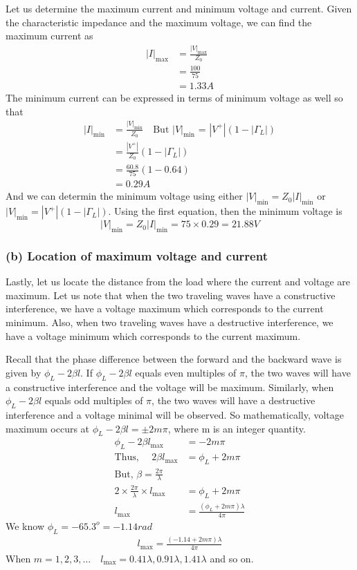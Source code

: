 \begin{exmp}
Let us determine the maximum current and minimum voltage and current. Given the characteristic impedance and the maximum voltage, we can find the maximum current as 
\begin{align*}
|I|_\max&=\frac{|V|_\max}{Z_0}\\
&=\frac{100}{75}\\
&=1.33A
\end{align*}
The minimum current can be expressed in terms of minimum voltage as well so that
\begin{align*}
|I|_\min&=\frac{|V|_\min}{Z_0}\quad\text{But }|V|_\min\text{ = }|V^+|(1 - |\Gamma_L|)\\
&=\frac{|V^{+}|}{Z_0}(1-|\Gamma_{L}|)\\
&=\frac{60.8}{75}(1-0.64)\\
&=0.29A
\end{align*}
And we can determin the minimum voltage using either $|V|_\min=Z_0|I|_\min$ or $|V|_\min=|V^{+}|(1-|\Gamma_{L}|)$. Using the first equation, then the minimum voltage is	
\begin{dmath*}
|V|_\min=Z_0|I|_\min
=75\times0.29=21.88V
\end{dmath*}

\subsubsection*{(b) Location of maximum voltage and current}
Lastly, let us locate the distance from the load where the current and voltage are maximum. Let us note that when the two traveling waves have a constructive interference, we have a voltage maximum which corresponds to the current minimum. Also, when two traveling waves have a destructive interference, we have a voltage minimum which corresponds to the current maximum.

Recall that the phase difference between the forward and the backward wave is given by $\phi_{L}-2\beta l$. If $\phi_{L}-2\beta l$ equals even multiples of $\pi$, the two waves will  have a constructive interference and the voltage will be maximum. Similarly, when $\phi_{L}-2\beta l$ equals odd multiples of $\pi$, the two waves will have a destructive interference and a voltage minimal will be observed. So mathematically, voltage maximum occurs at $\phi_{L}-2\beta l= \pm2m\pi$, where m is an integer quantity.
\begin{align*}
\phi_{L}-2\beta l_\max&=-2m\pi\\
\text{Thus, }\quad2\beta l_\max&= \phi_{L}+2m\pi\\
\text{But, }\beta = \frac{2\pi}{\lambda}\\
2 \times \frac{2\pi}{\lambda}\times l_\max&= \phi_{L}+2m\pi\\
l_\max&=\frac{(\phi_L + 2m\pi)\lambda}{4\pi}
\end{align*}
We know $\phi_{L}=-65.3^o=-1.14rad$
\begin{align*}
l_\max=\frac{(-1.14 + 2m\pi)\lambda}{4\pi}
\end{align*}
When $m = 1,2,3, \ldots\quad l_\max=0.41\lambda, 0.91\lambda, 1.41\lambda$ and so on.


\end{exmp}
